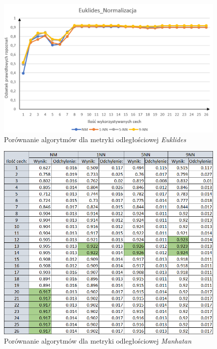 \documentclass[12pt]{article}
\begin{document}
\begin{figure}[H]
	\centering
		\includegraphics[scale=0.66]{images/algorithms/euklides_norm.png}
	\caption{Porównanie algorytmów dla metryki odległościowej \textit{Euklides}}
\end{figure}

\begin{figure}[H]
	\centering
		\includegraphics[scale=0.8]{images/algorithms/manhatan_norm_tab.png}
	\caption{Porównanie algorytmów dla metryki odległościowej \textit{Manhatan}}
\end{figure}
\end{document}
